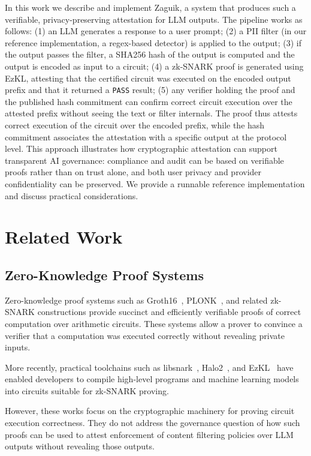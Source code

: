 \documentclass[10pt,conference,a4paper]{IEEEtran}
\begin{document}
In this work we describe and implement Zaguik, a system that produces such a verifiable, privacy-preserving attestation for LLM outputs. The pipeline works as follows: (1) an LLM generates a response to a user prompt; (2) a PII filter (in our reference implementation, a regex-based detector) is applied to the output; (3) if the output passes the filter, a SHA256 hash of the output is computed and the output is encoded as input to a circuit; (4) a zk-SNARK proof is generated using EzKL, attesting that the certified circuit was executed on the encoded output prefix and that it returned a \texttt{PASS} result; (5) any verifier holding the proof and the published hash commitment can confirm correct circuit execution over the attested prefix without seeing the text or filter internals. The proof thus attests correct execution of the circuit over the encoded prefix, while the hash commitment associates the attestation with a specific output at the protocol level. This approach illustrates how cryptographic attestation can support transparent AI governance: compliance and audit can be based on verifiable proofs rather than on trust alone, and both user privacy and provider confidentiality can be preserved. We provide a runnable reference implementation and discuss practical considerations.


\section{Related Work}
\subsection{Zero-Knowledge Proof Systems}

Zero-knowledge proof systems such as Groth16~\cite{groth2016size}, PLONK~\cite{gabizon2019plonk}, and related zk-SNARK constructions provide succinct and efficiently verifiable proofs of correct computation over arithmetic circuits. These systems allow a prover to convince a verifier that a computation was executed correctly without revealing private inputs.

More recently, practical toolchains such as libsnark~\cite{bensasson2014vn}, Halo2~\cite{halo2}, and EzKL~\cite{ezkl} have enabled developers to compile high-level programs and machine learning models into circuits suitable for zk-SNARK proving.

However, these works focus on the cryptographic machinery for proving circuit execution correctness. They do not address the governance question of how such proofs can be used to attest enforcement of content filtering policies over LLM outputs without revealing those outputs.
\end{document}
